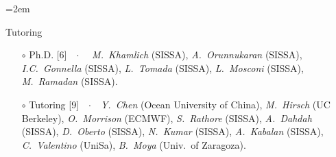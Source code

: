 \documentclass[
  usegeometry%
]{scrartcl}
\newcommand{\Description}[1]{\hangindent=2em\hangafter=0\noindent\raggedright\footnotesize{#1}\par\normalsize\vspace{1em}} %
\begin{document}
\begin{cv}{}
\Description{{\color{cyan} Tutoring}
\begin{itemize}
    \item[$\circ$] {\color{BrickRed}Ph.D.} [6]\ \ $\cdotp$\ \ \textit{ M.\ Khamlich} (SISSA), \textit{A.\ Orunnukaran} (SISSA),  \textit{I.C.\ Gonnella} (SISSA), \textit{ L.\ Tomada} (SISSA), \textit{L.\ Mosconi} (SISSA),  \textit{M.\ Ramadan} (SISSA).
    \item[$\circ$] {\color{orange}Tutoring} [9]\ \ $\cdotp$\ \ \textit{Y.\ Chen} (Ocean University of China), \textit{M.\ Hirsch} (UC Berkeley), \textit{O.\ Morrison} (ECMWF), \textit{S.\ Rathore} (SISSA), \textit{A.\ Dahdah} (SISSA), \textit{D.\ Oberto} (SISSA), \textit{N.\ Kumar} (SISSA), \textit{A.\ Kabalan} (SISSA), \textit{C.\ Valentino} (UniSa), \textit{B.\ Moya} (Univ.\ of Zaragoza).

\end{itemize}}
\end{cv}
\end{document}
